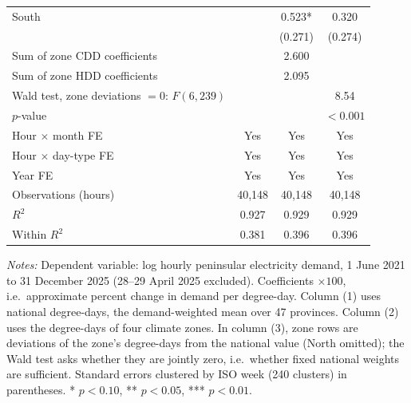 \documentclass[11pt]{article}
\begin{document}
\begin{table}[htbp]
\begin{threeparttable}
\begin{tabular}{@{}lccc@{}}
\quad South               &          & 0.523*   & 0.320    \\
                          &          & (0.271)  & (0.274)  \\
\midrule
Sum of zone CDD coefficients &       & 2.600    &          \\
Sum of zone HDD coefficients &       & 2.095    &          \\
Wald test, zone deviations $= 0$: $F(6, 239)$ & & & 8.54 \\
\quad $p$-value           &          &          & $<0.001$ \\
\midrule
Hour $\times$ month FE    & Yes & Yes & Yes \\
Hour $\times$ day-type FE & Yes & Yes & Yes \\
Year FE                   & Yes & Yes & Yes \\
Observations (hours)      & 40,148 & 40,148 & 40,148 \\
$R^2$                     & 0.927 & 0.929 & 0.929 \\
Within $R^2$              & 0.381 & 0.396 & 0.396 \\
\bottomrule
\end{tabular}
\begin{tablenotes}[flushleft]\footnotesize
\item \textit{Notes:} Dependent variable: log hourly peninsular electricity demand,
1 June 2021 to 31 December 2025 (28--29 April 2025 excluded). Coefficients
$\times 100$, i.e.\ approximate percent change in demand per degree-day.
Column (1) uses national degree-days, the demand-weighted mean over 47 provinces.
Column (2) uses the degree-days of four climate zones. In column (3), zone rows are
deviations of the zone's degree-days from the national value (North omitted);
the Wald test asks whether they are jointly zero, i.e.\ whether fixed national
weights are sufficient. Standard errors clustered by ISO week (240 clusters) in
parentheses. * $p<0.10$, ** $p<0.05$, *** $p<0.01$.
\end{tablenotes}
\end{threeparttable}
\end{table}
\end{document}

